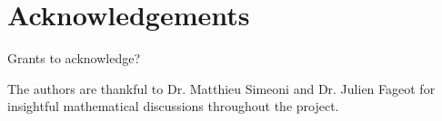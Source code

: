 
\section*{Acknowledgements}

Grants to acknowledge? 

The authors are thankful to Dr. Matthieu Simeoni and Dr. Julien Fageot for insightful mathematical discussions throughout the project. 


